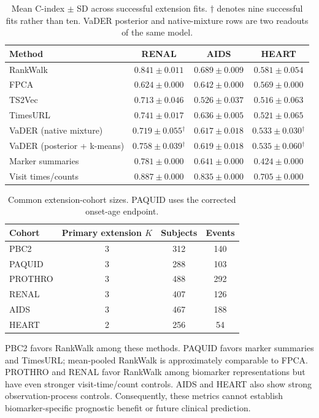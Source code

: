 \documentclass[11pt,a4paper]{article}
\begin{document}
\begin{table}[htbp]
\centering\small
\caption{Mean C-index $\pm$ SD across successful extension fits. $\dagger$ denotes nine successful fits rather than ten. VaDER posterior and native-mixture rows are two readouts of the same model.}
\begin{tabular}{lccc}\toprule
Method & RENAL & AIDS & HEART \\ \midrule
RankWalk & $0.841 \pm 0.011$ & $0.689 \pm 0.009$ & $0.581 \pm 0.054$ \\
FPCA & $0.624 \pm 0.000$ & $0.642 \pm 0.000$ & $0.569 \pm 0.000$ \\
TS2Vec & $0.713 \pm 0.046$ & $0.526 \pm 0.037$ & $0.516 \pm 0.063$ \\
TimesURL & $0.741 \pm 0.017$ & $0.636 \pm 0.005$ & $0.521 \pm 0.065$ \\
VaDER (native mixture) & $0.719 \pm 0.055$$^{\dagger}$ & $0.617 \pm 0.018$ & $0.533 \pm 0.030$$^{\dagger}$ \\
VaDER (posterior + k-means) & $0.758 \pm 0.039$$^{\dagger}$ & $0.619 \pm 0.018$ & $0.535 \pm 0.060$$^{\dagger}$ \\
Marker summaries & $0.781 \pm 0.000$ & $0.641 \pm 0.000$ & $0.424 \pm 0.000$ \\
Visit times/counts & $0.887 \pm 0.000$ & $0.835 \pm 0.000$ & $0.705 \pm 0.000$ \\
\bottomrule\end{tabular}
\end{table}

\begin{table}[htbp]
\centering\small
\caption{Common extension-cohort sizes. PAQUID uses the corrected onset-age endpoint.}
\begin{tabular}{lccc}\toprule
Cohort & Primary extension $K$ & Subjects & Events \\ \midrule
PBC2 & 3 & 312 & 140 \\
PAQUID & 3 & 288 & 103 \\
PROTHRO & 3 & 488 & 292 \\
RENAL & 3 & 407 & 126 \\
AIDS & 3 & 467 & 188 \\
HEART & 2 & 256 & 54 \\
\bottomrule\end{tabular}
\end{table}

PBC2 favors RankWalk among these methods. PAQUID favors marker summaries and TimesURL; mean-pooled RankWalk is approximately comparable to FPCA. PROTHRO and RENAL favor RankWalk among biomarker representations but have even stronger visit-time/count controls. AIDS and HEART also show strong observation-process controls. Consequently, these metrics cannot establish biomarker-specific prognostic benefit or future clinical prediction.
\end{document}
